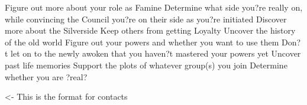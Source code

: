 \documentclass[char]{Silversiders}
\begin{document}
\name{\cFamine{}}

Figure out more about your role as Famine
Determine what side you?re really on, while convincing the Council you?re on their side as you?re initiated
Discover more about the Silverside
Keep others from getting Loyalty
Uncover the history of the old world
Figure out your powers and whether you want to use them
Don?t let on to the newly awoken that you haven?t mastered your powers yet
Uncover past life memories
Support the plots of whatever group(s) you join
Determine whether you are ?real?

\begin{itemz}[Goals]
	\item 
\end{itemz}

\begin{itemz}[Notes]
	\item 
\end{itemz}

\begin{contacts}
	\contact{\cTest{}} <- This is the format for contacts 
\end{contacts}
\end{document}
